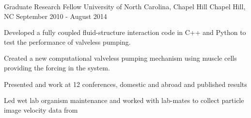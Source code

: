 \begin{cventries}
  \cventry
    {Graduate Research Fellow} %
    {University of North Carolina, Chapel Hill} %
    {Chapel Hill, NC} %
    {September 2010 - August 2014} %
    {
      \begin{cvitems} %
        \item {Developed a fully coupled fluid-structure interaction code in C++ and Python to test the performance of valveless pumping.}
		\item {Created a new computational valveless pumping mechanism using muscle cells providing the forcing in the system.}
		\item {Presented and work at 12 conferences, domestic and abroad and published results}
    \item {Led wet lab organism maintenance and worked with lab-mates to collect particle image velocity data from}
      \end{cvitems}
    }

\end{cventries}
